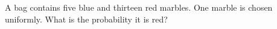 A bag contains five blue and thirteen red marbles. One marble is chosen uniformly. What is the probability it is red?
